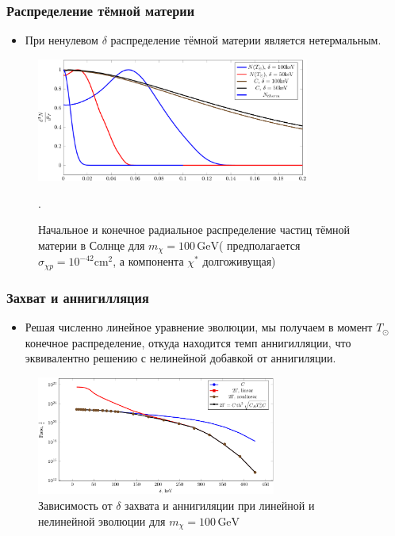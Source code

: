 \documentclass[
11pt,]{beamer}
\begin{document}
	

	
	\begin{frame}
		\frametitle{Распределение тёмной материи}
		\begin{itemize}
	\item При ненулевом $\delta$ распределение тёмной материи является нетермальным.
\end{itemize}
\begin{figure}[!h]
	\centering
	\includegraphics[width=0.8\textwidth]{images/Rdistribs.png}
	\caption{Начальное и конечное радиальное распределение частиц тёмной материи в Солнце для $m_{\chi} = 100 \, \text{GeV}$( предполагается $\sigma_{\chi p} = 10^{-42} \text{cm}^2$, а компонента $\chi^*$ долгоживущая)}.
	\label{plot:Nrdistrib}
\end{figure}

	\end{frame}
	\begin{frame}
		\frametitle{Захват и аннигилляция}
		\begin{itemize}
	\item Решая численно линейное уравнение эволюции, мы получаем в момент $T_{\odot}$ конечное распределение, откуда находится темп аннигилляции, что эквивалентно решению с нелинейной добавкой от аннигиляции.
\end{itemize}


\begin{figure}[!h]
	\centering
	\includegraphics[width=0.7\textwidth]{images/LinearNonLinear.png}
	\caption{Зависимость от $\delta$ захвата и аннигиляции при линейной и нелинейной эволюции для $m_{\chi} = 100 \,\text{GeV}$}
\end{figure}

	\end{frame}
	
\end{document}
